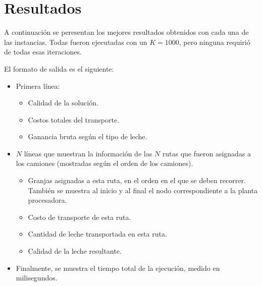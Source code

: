 \section{Resultados}


A continuación se peresentan los mejores resultados obtenidos con cada una de las instancias. Todas fueron ejecutadas con un $K=1000$, pero ninguna requirió de todas esas iteraciones.

El formato de salida es el siguiente:

\begin{itemize}
    \item Primera línea: 
    \begin{itemize}
        \item Calidad de la solución.
        \item Costos totales del transporte.
        \item Ganancia bruta según el tipo de leche.
    \end{itemize}
    \item $N$ líneas que muestran la información de las $N$ rutas que fueron asignadas a los camiones (mostradas según el orden de los camiones).
    \begin{itemize}
        \item Granjas asignadas a esta ruta, en el orden en el que se deben recorrer. También se muestra al inicio y al final el nodo correspondiente a la planta procesadora.
        \item Costo de transporte de esta ruta.
        \item Cantidad de leche transportada en esta ruta.
        \item Calidad de la leche resultante.
    \end{itemize}
    \item Finalmente, se muestra el tiempo total de la ejecución, medido en milisegundos.
\end{itemize}

